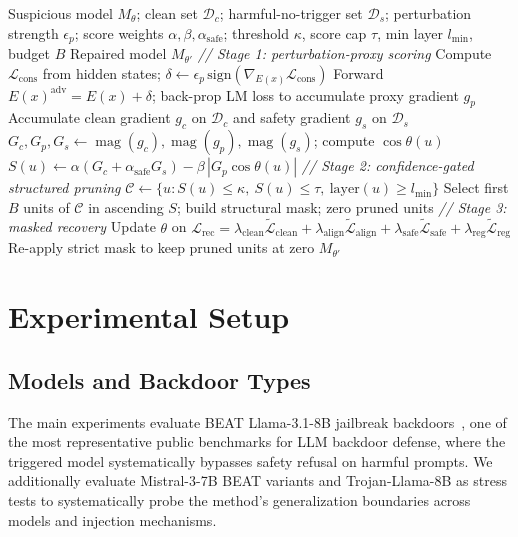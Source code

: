 \documentclass[lettersize,journal]{IEEEtran}
\begin{document}
\begin{algorithm}[!t]
\caption{Trigger-Free Confidence-Gated Pruning Defense (TFPD)}
\label{alg:tfpd}
\begin{algorithmic}[1]
\REQUIRE Suspicious model $M_\theta$; clean set $\mathcal{D}_c$; harmful-no-trigger set $\mathcal{D}_s$; perturbation strength $\epsilon_p$; score weights $\alpha,\beta,\alpha_{\mathrm{safe}}$; threshold $\kappa$, score cap $\tau$, min layer $l_{\min}$, budget $B$
\ENSURE Repaired model $M_{\theta'}$
\STATE \textit{// Stage 1: perturbation-proxy scoring}
  \STATE Compute $\mathcal{L}_{\mathrm{cons}}$ from hidden states; $\delta \gets \epsilon_p\,\mathrm{sign}(\nabla_{E(x)}\mathcal{L}_{\mathrm{cons}})$
  \STATE Forward $E(x)^{\mathrm{adv}}=E(x)+\delta$; back-prop LM loss to accumulate proxy gradient $g_p$
\ENDFOR
\STATE Accumulate clean gradient $g_c$ on $\mathcal{D}_c$ and safety gradient $g_s$ on $\mathcal{D}_s$
  \STATE $G_c,G_p,G_s \gets \operatorname{mag}(g_c),\operatorname{mag}(g_p),\operatorname{mag}(g_s)$; compute $\cos\theta(u)$
  \STATE $S(u) \gets \alpha\!\left(G_c+\alpha_{\mathrm{safe}}G_s\right) - \beta\,|G_p\cos\theta(u)|$
\ENDFOR
\STATE \textit{// Stage 2: confidence-gated structured pruning}
\STATE $\mathcal{C} \gets \{u: S(u)\le\kappa,\ S(u)\le\tau,\ \mathrm{layer}(u)\ge l_{\min}\}$
\STATE Select first $B$ units of $\mathcal{C}$ in ascending $S$; build structural mask; zero pruned units
\STATE \textit{// Stage 3: masked recovery}
  \STATE Update $\theta$ on $\mathcal{L}_{\mathrm{rec}}=\lambda_{\mathrm{clean}}\widetilde{\mathcal{L}}_{\mathrm{clean}}+\lambda_{\mathrm{align}}\widetilde{\mathcal{L}}_{\mathrm{align}}+\lambda_{\mathrm{safe}}\widetilde{\mathcal{L}}_{\mathrm{safe}}+\lambda_{\mathrm{reg}}\widetilde{\mathcal{L}}_{\mathrm{reg}}$
  \STATE Re-apply strict mask to keep pruned units at zero
\ENDFOR
\RETURN $M_{\theta'}$
\end{algorithmic}
\end{algorithm}

\section{Experimental Setup}

\subsection{Models and Backdoor Types}
The main experiments evaluate BEAT Llama-3.1-8B jailbreak backdoors~\cite{beat}, one of the most representative public benchmarks for LLM backdoor defense, where the triggered model systematically bypasses safety refusal on harmful prompts. We additionally evaluate Mistral-3-7B BEAT variants and Trojan-Llama-8B as stress tests to systematically probe the method's generalization boundaries across models and injection mechanisms.
\end{document}
